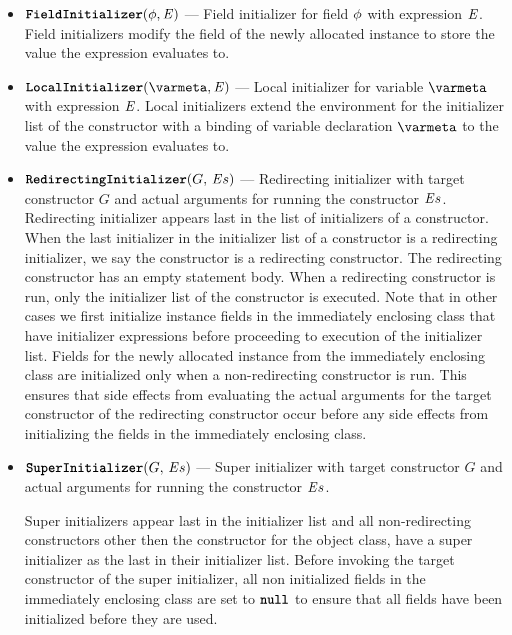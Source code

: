 \documentclass[a4paper,oneside,fleqn]{article}
\begin{document}
\begin{itemize}
    \item $\text{\textbf{\texttt{FieldInitializer}}}(\phi, \mathit{E})$ --- Field initializer for field $\phi$ with expression $\mathit{E}$.
        Field initializers modify the field of the newly allocated instance to store the value the expression evaluates to.
    \item $\LocalInitializer{\expressionmeta}$ --- Local initializer for variable $\varmeta$ with expression $\mathit{E}$.
        Local initializers extend the environment for the initializer list of the constructor with a binding of variable declaration $\varmeta$ to the value the expression evaluates to.
    \item $\text{\textbf{\texttt{RedirectingInitializer}}}(G,\,\mathit{E}{s})$ --- Redirecting initializer with target constructor $G$ and actual arguments for running the constructor $\mathit{E}{s}$.
        Redirecting initializer appears last in the list of initializers of a constructor.
        When the last initializer in the initializer list of a constructor is a redirecting initializer, we say the constructor is a redirecting constructor.
        The redirecting constructor has an empty statement body.
        When a redirecting constructor is run, only the initializer list of the constructor is executed.
        Note that in other cases we first initialize instance fields in the immediately enclosing class that have initializer expressions before proceeding to execution of the initializer list.
        Fields for the newly allocated instance from the immediately enclosing class are initialized only when a non-redirecting constructor is run.
        This ensures that side effects from evaluating the actual arguments for the target constructor of the redirecting constructor occur before any side effects from initializing the fields in the immediately enclosing class.
    \item $\text{\textbf{\texttt{SuperInitializer}}}(G,\,\mathit{E}{s})$ --- Super initializer with target constructor $G$ and actual arguments for running the constructor $\mathit{E}{s}$.

        Super initializers appear last in the initializer list and all non-redirecting constructors other then the constructor for the object class, have a super initializer as the last in their initializer list.
        Before invoking the target constructor of the super initializer, all non initialized fields in the immediately enclosing class are set to $\operatorname{\text{\textbf{\texttt{null}}}}$ to ensure that all fields have been initialized before they are used.
\end{itemize}
\end{document}
